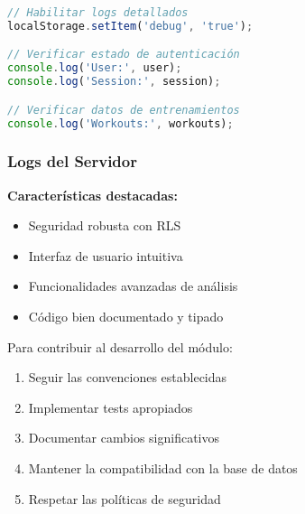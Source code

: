 \documentclass[12pt,a4paper]{article}
\begin{document}
\begin{lstlisting}[language=javascript, caption=Debugging en cliente]
// Habilitar logs detallados
localStorage.setItem('debug', 'true');

// Verificar estado de autenticación
console.log('User:', user);
console.log('Session:', session);

// Verificar datos de entrenamientos
console.log('Workouts:', workouts);
\end{lstlisting}

\subsubsection{Logs del Servidor}



\textbf{Características destacadas:}
\begin{itemize}
    \item Seguridad robusta con RLS
    \item Interfaz de usuario intuitiva
    \item Funcionalidades avanzadas de análisis
    \item Código bien documentado y tipado
\end{itemize}

Para contribuir al desarrollo del módulo:
\begin{enumerate}
    \item Seguir las convenciones establecidas
    \item Implementar tests apropiados
    \item Documentar cambios significativos
    \item Mantener la compatibilidad con la base de datos
    \item Respetar las políticas de seguridad
\end{enumerate}
\end{document}
